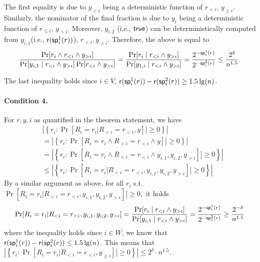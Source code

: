 The first equality is due to $y_{< i}$ being a deterministic function of $r_{< i}$, $y_{\geq i}$.
Similarly, the nominator of the final fraction is due to $y_{i}$ being a deterministic function of $r_{\leq i}$, $y_{>i}$. Moreover, 
 $y_{i,2}$ (i.e., $\mathsf{true}$) can be deterministically computed from $y_{i,1}$(i.e., $\mathsf{r}(\mathsf{sp}^1_i(r))$), $r_{<i}, y_{>i}$. Therefore, the above is equal to
\begin{equation}\label{eq:sp1_sp2}
    \frac{\Pr[r_i \land r_{<i} \land y_{> i} ]}{\Pr[y_{i,1}  \mid r_{<i} \land y_{>i}]  \Pr[r_{<i} \land y_{>i} ]} = \frac{\Pr[r_i \mid r_{<i} \land y_{>i} ]}{\Pr[y_{1,i} \mid r_{<i} \land y_{>i} ]} =\frac{2^{-\mathsf{sp}^1_i(r)}}{2^{-\mathsf{sp}^2_i(r)}} \leq \frac{2^\delta}{n^{1.5}}.
\end{equation}

The last inequality holds since $i \in V$, 
$\mathsf{r}(\mathsf{sp}^1_i(r)) - \mathsf{r}(\mathsf{sp}^2_i(r)) \ge 1.5\lg(n)$.

\paragraph{Condition 4.}
For $r, y, i$ as quantified in the theorem statement, we have 
\begin{align*}
& \left | \left \{ r_i : \Pr[R_i = r_i|R_{<i} = r_{<i}, y]] \geq 0 \right \}  \right | \\&= 
\left | \left \{ r_i : \Pr[R_i = r_i \land R_{<i} = r_{<i} \land y ]] \geq 0 \right \}  \right |\\
&=
\left | \left \{ r_i : \Pr[R_i = r_i \land R_{<i} = r_{<i} \land  y_{i,1}, y_{i,2}, y_{>i} ]] \geq 0 \right \}  \right |\\
&\leq \left | \left \{ r_i : \Pr[R_i = r_i | R_{<i} = r_{<i}, y_{i,1}, y_{i,2}, y_{>i} ]] \geq 0 \right \}  \right |
\end{align*}
%
By a similar argument as above, for all 
$r_i$ s.t. $\Pr[R_i = r_i | R_{<i} = r_{<i}, y_{i,1}, y_{i,2}, y_{>i} ]] \geq 0,$ it holds 
\[\Pr[R_i = r_i | R_{<i} = r_{<i}, y_{i,1}, y_{i,2}, y_{>i} ]
= \frac{\Pr[r_i \mid r_{<i} \land y_{>i} ]}{\Pr[y_{i,1} \mid r_{<i} \land y_{>i} ]} = \frac{2^{-\mathsf{sp}^1_i(r)}}{2^{-\mathsf{sp}^2_1(r)}}\geq \frac{2^{-\delta}}{n^{1.5}} \]
where the inequality holds since $i \in W$, we know that
$\mathsf{r}(\mathsf{sp}^1_i(r)) - \mathsf{r}(\mathsf{sp}^2_i(r)) \le 1.5\lg(n)$.
This means that 
$ \left | \left \{ r_i : \Pr[R_i = r_i | R_{<i} = r_{<i}, y_{\ge i} ]] \geq 0 \right \}  \right |
\leq 2^\delta \cdot n^{1.5}. $

